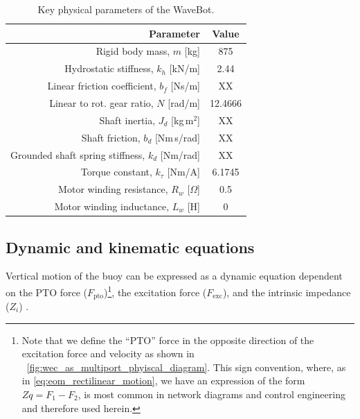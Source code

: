 \documentclass[lettersize,journal]{IEEEtran}
\begin{document}
\begin{table}[tb]
        \caption{Key physical parameters of the WaveBot.}
        \label{tab:wec_phyiscal_params}
        \centering

        \begin{tabular}{rc}
        \hline

        \hline
        \textbf{Parameter} & \textbf{Value} \\
        \hline
        Rigid body mass, $m$ [kg]                       & 875 \\
        Hydrostatic stiffness, $k_h$ [kN/m]             & 2.44 \\
        Linear friction coefficient, $b_f$ [Ns/m]       & XX \\
        Linear to rot. gear ratio, $N$ [rad/m]          & 12.4666 \\
        Shaft inertia, $J_d$ [kg\,m$^2$]                & XX \\
        Shaft friction, $b_d$ [Nm\,s/rad]               & XX \\
        Grounded shaft spring stiffness, $k_d$ [Nm/rad] & XX \\
        Torque constant, $k_\tau$ [Nm/A]                & 6.1745 \\
        Motor winding resistance, $R_w$ [$\Omega$]      & 0.5 \\
        Motor winding inductance, $L_w$ [H]             & 0 \\
        \hline

        \hline
        \end{tabular}
\end{table}

\subsection{Dynamic and kinematic equations}\label{sec:dynamic_and_kinematic_equations}
Vertical motion of the buoy can be expressed as a dynamic equation dependent on the PTO force ($F_{\textrm{pto}}$)\footnote{Note that we define the ``PTO'' force in the opposite direction of the excitation force and velocity as shown in \figurename~\ref{fig:wec_as_multiport_phyiscal_diagram}. This sign convention, where, as in \eqref{eq:eom_rectilinear_motion}, we have an expression of the form $Z q = F_1 - F_2$, is most common in network diagrams and control engineering and therefore used herein.}, the excitation force ($F_{\textrm{exc}}$), and the intrinsic impedance ($Z_i$) \cite{Falnes:2002aa}.
\end{document}
